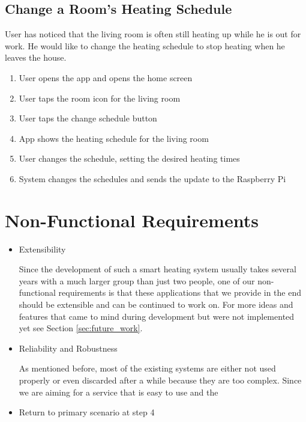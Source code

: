 \subsection{Change a Room's Heating Schedule}
User has noticed that the living room is often still heating up while he is out for work. He would like to change the heating schedule to stop heating when he leaves the house.
\begin{enumerate}
    \item User opens the app and opens the home screen
    \item User taps the room icon for the living room
    \item User taps the change schedule button
    \item App shows the heating schedule for the living room
    \item User changes the schedule, setting the desired heating times
    \item System changes the schedules and sends the update to the Raspberry Pi
\end{enumerate}

\section{Non-Functional Requirements}

\begin{itemize}
    \item Extensibility
    
    Since the development of such a smart heating system usually takes several years with a much larger group than just two people, one of our non-functional requirements is that these applications that we provide in the end should be extensible and can be continued to work on. For more ideas and features that came to mind during development but were not implemented yet see Section \ref{sec:future_work}.
    \item Reliability and Robustness
    
    As mentioned before, most of the existing systems are either not used properly or even discarded after a while because they are too complex. Since we are aiming for a service that is easy to use and the
    \item Return to primary scenario at step 4
\end{itemize}





